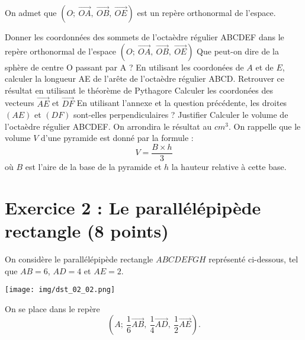 \documentclass{exam}
\begin{document}
On admet que $\left(O\mathpunct{} ; \ \overrightarrow{OA}\mathpunct{}, \ \overrightarrow{OB}\mathpunct{}, \ \overrightarrow{OE}\right)$ est un repère orthonormal de l'espace.
\begin{questions}
  \question[2.25] Donner les coordonnées des sommets de l'octaèdre régulier ABCDEF dans le repère orthonormal de l'espace $\left(O\mathpunct{} ; \ \overrightarrow{OA}\mathpunct{}, \ \overrightarrow{OB}\mathpunct{}, \ \overrightarrow{OE}\right)$
  \question[1] Que peut-on dire de la sphère de centre O passant par A ?
  \question[1] En utilisant les coordonées de $A$ et de $E$, calculer la longueur AE de l'arête de l'octaèdre régulier ABCD.
  \question[1] Retrouver ce résultat en utilisant le théorème de Pythagore
  \question[1] Calculer les coordonées des vecteurs $\overrightarrow{AE}$ et $\overrightarrow{DF}$
  \question[0.75] En utilisant l'annexe et la question précédente, les droites $(AE)$ et $(DF)$ sont-elles perpendiculaires ? Justifier
  \question[1] Calculer le volume de l'octaèdre régulier ABCDEF. On arrondira le résultat au $cm^3$. On rappelle que le volume $V$ d'une pyramide est donné par la formule :
 \[
  V = \frac{B \times h}{3}
  \]
  où $B$ est l'aire de la base de la pyramide et $h$ la hauteur relative à cette base.
\end{questions} 


\section*{Exercice 2 : Le parallélépipède rectangle (8 points)}

On considère le parallélépipède rectangle $ABCDEFGH$ représenté ci-dessous, tel que $AB = 6$, $AD = 4$ et $AE = 2$.

\begin{center}
    \texttt{[image: img/dst\_02\_02.png]}
\end{center}

On se place dans le repère 
\[
\left(A \mathpunct{}; \ \frac{1}{6} \overrightarrow{AB}\mathpunct{}, \ \frac{1}{4} \overrightarrow{AD}\mathpunct{}, \ \frac{1}{2} \overrightarrow{AE}\right).
\]
\end{document}
